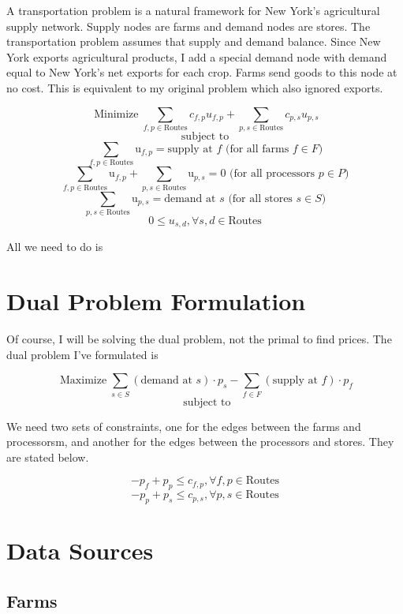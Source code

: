 \documentclass{report}
\begin{document}
A transportation problem is a natural framework for New York's agricultural supply network. Supply nodes are farms and demand nodes are stores.  The transportation problem assumes that supply and demand balance. Since New York exports agricultural products, I add a special demand node with demand equal to New York's net exports for each crop. Farms send goods to this node at no cost. This is equivalent to my original problem which also ignored exports. 

$$\operatorname{Minimize} \sum_{f,p \in \text{Routes}} c_{f,p} u_{f,p} + \sum_{p,s \in \text{Routes}} c_{p,s} u_{p,s}$$
$$\text{subject to}$$
$$\sum_{f,p \in \text{Routes}} \text{u}_{f,p}= \text{supply at } f \text{ (for all farms } f \in F)$$
$$\sum_{f,p \in \text{Routes}} \text{u}_{f,p} + \sum_{p,s \in \text{Routes}} \text{u}_{p,s} = 0 \text{ (for all processors } p \in P)$$
$$\sum_{p,s \in \text{Routes}} \text{u}_{p,s}= \text{demand at } s \text{ (for all stores } s \in S)$$
$$0 \leq u_{s,d}, \forall s,d \in \text{Routes}$$


All we need to do is 

\section{Dual Problem Formulation}

Of course, I will be solving the dual problem, not the primal to find prices. The dual problem I've formulated is

$$\operatorname{Maximize} \sum_{s \in S}  (\text{demand at } s) \cdot p_{s} -   \sum_{f \in F}  (\text{supply at } f) \cdot p_{f} $$
$$ \text{ subject to}$$

We need two sets of constraints, one for the edges between the farms and processorsm, and another for the edges between the processors and stores. They are stated below.

$$ -p_f + p_p \leq c_{f,p}, \forall f,p\in \textrm{Routes}$$
$$ -p_p + p_s \leq c_{p,s}, \forall p,s\in \textrm{Routes}$$

\section{Data Sources}

\subsection{Farms}
\end{document}
